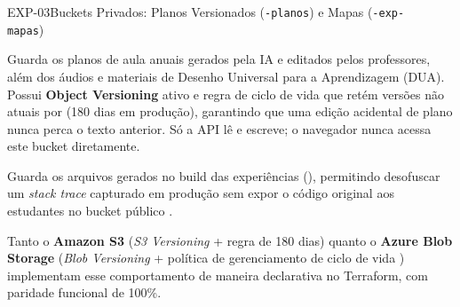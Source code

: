 \begin{pecaarq}{EXP-03}{Buckets Privados: Planos Versionados (\texttt{-planos}) e Mapas (\texttt{-exp-mapas})}{\sgcp~\nativo\enspace\saws~\nativo\enspace\sazure~\nativo}
\begin{campos}
  \item[Planos e anexos DUA (\texttt{-planos})] Guarda os planos de aula anuais
    gerados pela IA e editados pelos professores, além dos áudios e materiais
    de Desenho Universal para a Aprendizagem (DUA). Possui \textbf{Object
    Versioning} ativo e regra de ciclo de vida que retém versões não atuais por
     (180 dias em produção), garantindo que uma
    edição acidental de plano nunca perca o texto anterior. Só a API lê e
    escreve; o navegador nunca acessa este bucket diretamente.
  \item[Sourcemaps (\texttt{-exp-mapas})] Guarda os arquivos 
    gerados no build das experiências (), permitindo
    desofuscar um \emph{stack trace} capturado em produção sem expor o código
    original aos estudantes no bucket público .
  \item[Tradução AWS e Azure] Tanto o \textbf{Amazon S3} (\emph{S3 Versioning} +
    regra  de 180 dias) quanto o \textbf{Azure
    Blob Storage} (\emph{Blob Versioning} + política de gerenciamento de ciclo
    de vida ) implementam esse
    comportamento de maneira declarativa no Terraform, com paridade funcional de
    100\%.
\end{campos}
\end{pecaarq}

